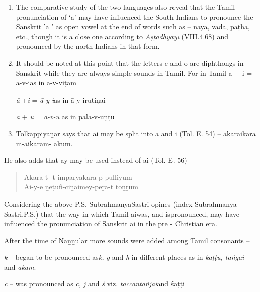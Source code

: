 \begin{enumerate}[{\rm 1)}]
\itemsep=0pt
\item The comparative study of the two languages also reveal that the Tamil pronunciation of ‘a’ may have influenced the South Indians to pronounce the Sanskrit ’a ’ as open vowel at the end of words such as – naya, vada, paṭha, etc., though it is a close one according to \textit{Aṣṭādhyāyī} (VIII.4.68) and pronounced by the north Indians in that form.

 \item 
 It should be noted at this point that the letters e and o are diphthongs in Sanskrit while they are always simple sounds in Tamil. For in Tamil a + i = a-v-ias in a-v-viṭam

 \textit{ā} +\textit{i} = \textit{ā-y-i}as in ā-y-irutiṇai

 \textit{a} + \textit{u} = \textit{a-v-u} as in pala-v-uṇṭu

 \item Tolkāppiyaṉār says that ai may be split into a and i (Tol. E. 54) – akaraikara m-aikāram- ākum.

\end{enumerate}

He also adds that ay may be used instead of ai (Tol. E. 56) –

\begin{verse}
Akara-t- t-imparyakara-p puḻḻiyum\\ Ai-y-e ṉeṭuñ-ciṉaimey-peṟa-t toṉṟum
\end{verse}

Considering the above P.S. SubrahmanyaSastri opines (index Subrahmanya Sastri,P.S.) that the way in which Tamil aiwas, and is\break pronounced, may have influenced the pronunciation of Sanskrit ai in the pre - Christian era.

After the time of Naṉṉūlār more sounds were added among Tamil consonants –

\begin{myquote}
\textit{k} – began to be pronounced as\textit{k, g} and \textit{h} in different places as in \textit{kaṭṭu, taṅgai} and \textit{akam}.
\end{myquote}

\begin{myquote}
\textit{c} – was pronounced as \textit{c, j} and \textit{ś} viz. \textit{taccantañjai}and śaṭṭi
\end{myquote}

